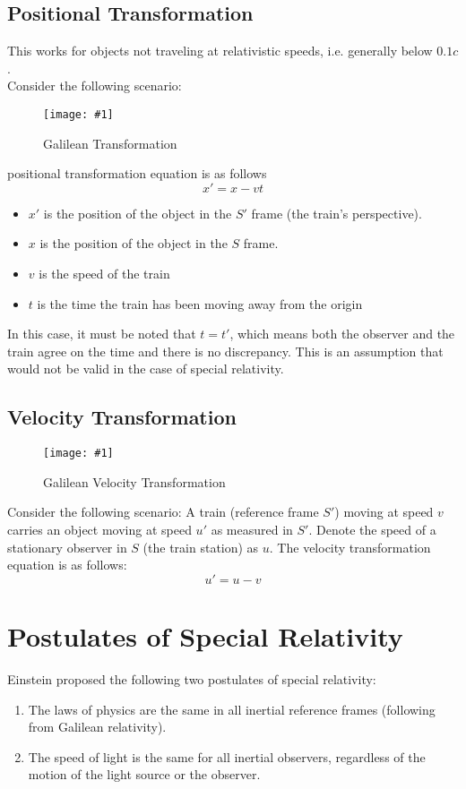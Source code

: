 \documentclass[a4paper,12pt]{article}
\let\oldsection\section
\renewcommand\section{\clearpage\oldsection}
\newcommand{\lb}{\\[8pt]}
\newcommand{\img}[4]{\begin{center}
  \begin{figure}[H]
    \centering
    \texttt{[image: \#1]}
    \caption{#3}
    \label{fig:#4}
  \end{figure}
\end{center}}
\begin{document}
\subsection{Positional Transformation}
This works for objects not traveling at relativistic speeds, i.e. generally below $0.1c$. \lb
Consider the following scenario:
\img{galileanpos.png}{0.7}{Galilean Transformation}{galileanpos}
positional transformation equation is as follows
$$x' = x - vt$$
\begin{itemize}
  \item $x'$ is the position of the object in the $S'$ frame (the train's perspective).
  \item $x$ is the position of the object in the $S$ frame.
  \item $v$ is the speed of the train
  \item $t$ is the time the train has been moving away from the origin
\end{itemize}
In this case, it must be noted that $t = t'$, which means both the observer and the train agree on the time and there is no discrepancy. This is an assumption that would not be valid in the case of special relativity.

\subsection{Velocity Transformation}

\img{galileanspeed.png}{0.7}{Galilean Velocity Transformation}{galileanspeed}

Consider the following scenario: A train (reference frame $S'$) moving at speed $v$ carries an object moving at speed $u'$ as measured in $S'$. Denote the speed of a stationary observer in $S$ (the train station) as $u$. The velocity transformation equation is as follows:
$$u' = u - v$$


\section{Postulates of Special Relativity}

Einstein proposed the following two postulates of special relativity:
\begin{enumerate}
  \item The laws of physics are the same in all inertial reference frames (following from Galilean relativity).
  \item The speed of light is the same for all inertial observers, regardless of the motion of the light source or the observer.
\end{enumerate}
\end{document}
